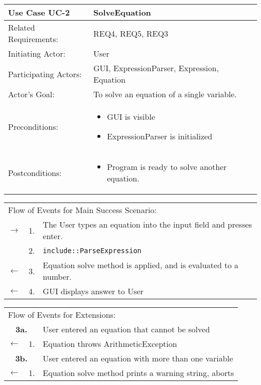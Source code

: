 \documentclass[11pt]{article}
\newcommand{\code}[1]{\texttt{#1}}
\begin{document}
\newpage
\begin{center}
\begin{tabular}{p{1.5in}p{5in}}
\hline
\textbf{Use Case UC-2}     & \textbf{SolveEquation} \\ \hline
Related Requirements: & REQ4, REQ5, REQ3 \\
Initiating Actor:     & User \\
Participating Actors: & GUI, ExpressionParser, Expression, Equation \\
Actor's Goal:          & To solve an equation of a single variable. \\
Preconditions:         & \begin{itemize}[nosep]
                         \item GUI is visible
                         \item ExpressionParser is initialized
                         \end{itemize} \\
Postconditions:        & \begin{itemize}[nosep]
                         \item Program is ready to solve another equation.
                         \end{itemize} \\ \hline
\end{tabular}

\begin{tabular}{p{.25in}p{.25in}p{5.8in}}
\multicolumn{3}{l}{Flow of Events for Main Success Scenario:} \\
$\rightarrow$ & 1. & The User types an equation into the input field and presses enter. \\
            & 2. & \code{include::ParseExpression} \\ 
$\leftarrow$  & 3. &Equation solve method is applied, and is evaluated to a number.  \\
$\leftarrow$  & 4. & GUI displays answer to User \\
\end{tabular}

\begin{tabular}{p{.25in}p{.25in}p{5.8in}}
\multicolumn{3}{l}{Flow of Events for Extensions:} \\
\multicolumn{2}{c}{\textbf{3a.}} & User entered an equation that cannot be solved \\
$\leftarrow$  & 1.           & Equation throws ArithmeticException \\

\multicolumn{2}{c}{\textbf{3b.}} & User entered an equation with more than one variable \\
$\leftarrow$  & 1.           & Equation solve method prints a warning string, aborts \\




\end{tabular}
\end{center}
\end{document}
